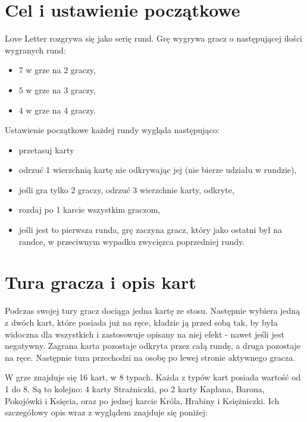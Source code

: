 \section*{Cel i ustawienie początkowe}
\label{sec:celIUstawieniePoczatkowe}
Love Letter rozgrywa się jako serię rund. Grę wygrywa gracz o następującej ilości wygranych rund:
\begin{itemize}
	\item 7 w grze na 2 graczy,
	\item 5 w grze na 3 graczy,
	\item 4 w grze na 4 graczy.
\end{itemize}

Ustawienie początkowe każdej rundy wygląda następująco:
\begin{itemize}
	\item przetasuj karty
	\item odrzuć 1 wierzchnią kartę nie odkrywając jej (nie bierze udziału w rundzie),
	\item jeśli gra tylko 2 graczy, odrzuć 3 wierzchnie karty, odkryte,
	\item rozdaj po 1 karcie wszystkim graczom,
	\item jeśli jest to pierwsza runda, grę zaczyna gracz, który jako ostatni był na randce, w przeciwnym wypadku zwycięzca poprzedniej rundy.
\end{itemize}

\section*{Tura gracza i opis kart}
\label{sec:turaGracza}
Podczas swojej tury gracz dociąga jedna kartę ze stosu. Następnie wybiera jedną z dwóch kart, które posiada już na ręce, kładzie ją przed sobą tak, by była widoczna dla wszystkich i zastosowuje opisany na niej efekt - nawet jeśli jest negatywny. Zagrana karta pozostaje odkryta przez całą rundę, a druga pozostaje na ręce. Następnie tura przechodzi na osobę po lewej stronie aktywnego gracza.

W grze znajduje się 16 kart, w 8 typach. Każda z typów kart posiada wartość od 1 do 8. Są to kolejno: 4 karty Strażniczki, po 2 karty Kapłana, Barona, Pokojówki i Księcia, oraz po jednej karcie Króla, Hrabiny i Księżniczki. Ich szczegółowy opis wraz z wyglądem znajduje się poniżej:

